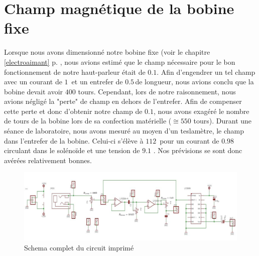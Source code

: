 \section{Champ magnétique de la bobine fixe}
\label{mesures champ}
Lorsque nous avons dimensionné notre bobine fixe (voir le chapitre \ref{electroaimant} p. \pageref{electroaimant}, nous avions estimé que le champ nécessaire pour le bon fonctionnement de notre haut-parleur était de $0.1$\tesla.  Afin d'engendrer un tel champ avec un courant de $1$\ampere \, et un entrefer de $0.5$\centi\meter \,de longueur, nous avions conclu que la bobine devait avoir $400$ tours. Cependant, lors de notre raisonnement, nous avions négligé la "perte" de champ en dehors de l'entrefer. Afin de compenser cette perte et donc d'obtenir notre champ de $0.1$\tesla, nous avons exagéré le nombre de tours de la bobine lors de sa confection matérielle ($\cong 550$ tours). 
Durant une séance de laboratoire, nous avons mesuré au moyen d'un teslamètre, le champ dans l'entrefer de la bobine. Celui-ci s'élève à $112$\milli \tesla \, pour un courant de $0.98$ \ampere \,circulant dans le solénoïde et une tension de $9.1$ \volt. Nos prévisions se sont donc avérées relativement bonnes.

\begin{figure}[h!]
\begin{center}
\includegraphics[width=\textwidth]{img/circuitcomplet} 
\end{center}
\caption{Schema complet du circuit imprimé}		
\label{circuitcomplet}		
\end{figure}